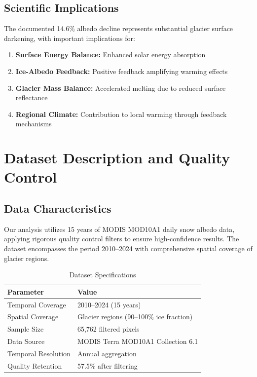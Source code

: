 \documentclass[12pt,a4paper]{article}
\begin{document}
\subsection{Scientific Implications}

The documented 14.6\% albedo decline represents substantial glacier surface darkening, with important implications for:
\begin{enumerate}
    \item \textbf{Surface Energy Balance:} Enhanced solar energy absorption
    \item \textbf{Ice-Albedo Feedback:} Positive feedback amplifying warming effects  
    \item \textbf{Glacier Mass Balance:} Accelerated melting due to reduced surface reflectance
    \item \textbf{Regional Climate:} Contribution to local warming through feedback mechanisms
\end{enumerate}

\section{Dataset Description and Quality Control}

\subsection{Data Characteristics}

Our analysis utilizes 15 years of MODIS MOD10A1 daily snow albedo data, applying rigorous quality control filters to ensure high-confidence results. The dataset encompasses the period 2010--2024 with comprehensive spatial coverage of glacier regions.

\begin{table}[H]
\centering
\caption{Dataset Specifications}
\label{tab:dataset_specs}
\begin{tabular}{@{}ll@{}}
\toprule
\textbf{Parameter} & \textbf{Value} \\
\midrule
Temporal Coverage & 2010--2024 (15 years) \\
Spatial Coverage & Glacier regions (90--100\% ice fraction) \\
Sample Size & 65,762 filtered pixels \\
Data Source & MODIS Terra MOD10A1 Collection 6.1 \\
Temporal Resolution & Annual aggregation \\
Quality Retention & 57.5\% after filtering \\
\bottomrule
\end{tabular}
\end{table}
\end{document}

